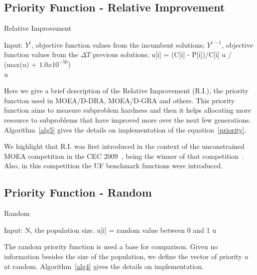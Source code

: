 \subsection{Priority Function - Relative Improvement}  

\begin{algorithm}[t]
	\caption{Relative Improvement}\label{alg5}
	\begin{algorithmic}[1]
		
		\State Input:   $Y^t$, objective function values from the incumbent solutions; $Y^{t-1}$, objective function values from the $\Delta T$ previous solutions;
		\State u[i] = (C[i] - P[i])/C[i]
		\EndFor
		u / (max(u) + $1.0 x 10^{-50}$)\\
		\Return u
	\end{algorithmic}
\end{algorithm}

Here we give a brief description of the Relative Improvement (R.I.), the priority function used in MOEA/D-DRA, MOEA/D-GRA and others. This priority function aims to measure subproblem hardness and then it helps allocating more resource to subproblems that have  improved more over the next few generations. Algorithm~\ref{alg5} gives the details on implementation of the equation~\ref{priority}. 

We highlight that R.I. was first introduced in the context of the unconstrained MOEA competition in the CEC 2009~\cite{zhang2009performance}, being the winner of that competition~\cite{zhang2008multiobjective}. Also, in this competition the UF benchmark functions were introduced.

\subsection{Priority Function - Random}

\begin{algorithm}[t]
	\caption{Random}\label{alg4}
	\begin{algorithmic}[1]
		
		\State Input:  N, the population size.
		\For {i=1 to N}
		\State u[i] = random value between 0 and 1
		\EndFor
		\Return u
	\end{algorithmic}
\end{algorithm}

The random priority function is used a base for comparison. Given no information besides the size of the population, we define the vector of priority $u$ at random. Algorithm~\ref{alg4} gives the details on implementation. 
%
%
%
%
% 
%




